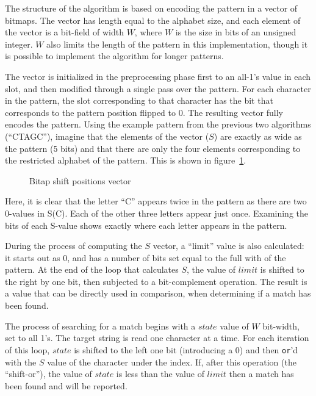 The structure of the algorithm is based on encoding the pattern in a vector of bitmaps. The vector has length equal to the alphabet size, and each element of the vector is a bit-field of width $W$, where $W$ is the size in bits of an unsigned integer. $W$ also limits the length of the pattern in this implementation, though it is possible to implement the algorithm for longer patterns.

The vector is initialized in the preprocessing phase first to an all-1's value in each slot, and then modified through a single pass over the pattern. For each character in the pattern, the slot corresponding to that character has the bit that corresponds to the pattern position flipped to 0. The resulting vector fully encodes the pattern. Using the example pattern from the previous two algorithms (``CTAGC''), imagine that the elements of the vector ($S$) are exactly as wide as the pattern (5 bits) and that there are only the four elements corresponding to the restricted alphabet of the pattern. This is shown in figure~\ref{fig:bitap_s_positions}.

\begin{figure}[ht]
\centering

\caption{Bitap shift positions vector}
\label{fig:bitap_s_positions}
\end{figure}

Here, it is clear that the letter ``C'' appears twice in the pattern as there are two 0-values in S(C). Each of the other three letters appear just once. Examining the bits of each S-value shows exactly where each letter appears in the pattern.

During the process of computing the $S$ vector, a ``limit'' value is also calculated: it starts out as 0, and has a number of bits set equal to the full with of the pattern. At the end of the loop that calculates $S$, the value of $limit$ is shifted to the right by one bit, then subjected to a bit-complement operation. The result is a value that can be directly used in comparison, when determining if a match has been found.

The process of searching for a match begins with a $state$ value of $W$ bit-width, set to all 1's. The target string is read one character at a time. For each iteration of this loop, $state$ is shifted to the left one bit (introducing a 0) and then \texttt{or}'d with the $S$ value of the character under the index. If, after this operation (the ``shift-or''), the value of $state$ is less than the value of $limit$ then a match has been found and will be reported.

